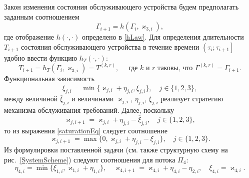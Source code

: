 \documentclass[11pt]{ubs}
\begin{document}
Закон изменения состояния обслуживающего устройства будем предполагать заданным соотношением 
\begin{equation*}
\Gamma_{i+1}=h(\Gamma_i,\varkappa_{3,i}),
\end{equation*}
где отображение $h(\cdot,\cdot)$ определено в \eqref{hLaw}.
Для определения длительности $T_{i+1}$ состояния обслуживающего устройства в течение времени $\left(\tau_{i};\tau_{i+1}\right]$ удобно ввести функцию $h_T(\cdot,\cdot)$:
\begin{equation*}
T_{i+1}=h_T(\Gamma_i,\varkappa_{3,i})= T^{(k,r)},\quad  \text{ где $k$ и $r$ таковы, что } \Gamma^{(k,r)}=\Gamma_{i+1}.
\end{equation*}
Функциональная зависимость
\begin{equation}
\overline{\xi}_{j,i}=\min\{\varkappa_{j,i}+\eta_{j,i},\xi_{j,i}\}, \quad j\in \{1,2,3\},
\label{saturationEq}
\end{equation}
между величиной $\overline{\xi}_{j,i}$ и величинами $\varkappa_{j,i}$, $\eta_{j,i}$, $\xi_{j,i}$ реализует стратегию механизма обслуживания требований. Далее, поскольку 
\begin{equation*}
\varkappa_{j,i+1}=\varkappa_{j,i}+\eta_{j,i}-\overline{\xi}_{j,i}, \quad  j\in \{1,2,3\},
\end{equation*}
то из выражения \eqref{saturationEq} следует соотношение
\begin{equation*}
\varkappa_{j,i+1}=\max\{{0,\varkappa_{j,i}+\eta_{j,i}-\xi_{j,i}}\}, \quad j\in \{1,2,3\}.
\end{equation*}
Из формулировки поставленной задачи (см. также структурную схему на рис.~\ref{SystemScheme}) следуют соотношения для потока $\Pi_4$:
\begin{equation*}
\eta_{4,i} = \min\{\xi_{1,i}, \varkappa_{1,i}+\eta_{1,i}\}, \quad \varkappa_{4,i+1}=\varkappa_{4,i}+\eta_{4,i}-\eta_{2,i}, \quad \xi_{4,i} = \varkappa_{4,i}.
\end{equation*}
\end{document}
